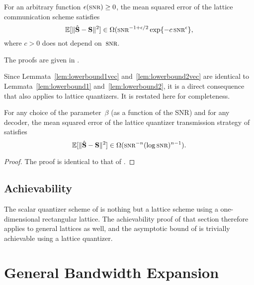 \begin{lemma}
  \label{lem:lowerbound2vec}
  For an arbitrary function $\e(\snr) \ge 0$, the mean squared error of the
  lattice communication scheme satisfies
  \begin{equation*}
    \msev \in \Omega(\snr^{-1 + \e/2} \exp\{- c \snr^\e \},
  \end{equation*}
  where $c > 0$ does not depend on~$\snr$.
\end{lemma}

The proofs are given in .

Since Lemmata~\ref{lem:lowerbound1vec} and~\ref{lem:lowerbound2vec} are
identical to Lemmata~\ref{lem:lowerbound1} and~\ref{lem:lowerbound2}, it is a
direct consequence that  also applies to lattice quantizers.
It is restated here for completeness.

\begin{theorem}
  \label{thm:scalinglbvec}
  For any choice of the parameter~$\beta$ (as a function of the SNR) and for any
  decoder, the mean squared error of the lattice quantizer transmission strategy
  of  satisfies
  \begin{equation*}
    \msev \in \Omega(\snr^{-n} (\log\snr)^{n-1}).
  \end{equation*}
\end{theorem}

\begin{proof}
  The proof is identical to that of .
\end{proof}


\subsection{Achievability}

The scalar quantizer scheme of  is nothing but a lattice
scheme using a one-dimensional rectangular lattice. The achievability proof of
that section therefore applies to general lattices as well, and the asymptotic
bound of  is trivially achievable using a lattice
quantizer.





\section{General Bandwidth Expansion}\label{sec:genbwexp}

